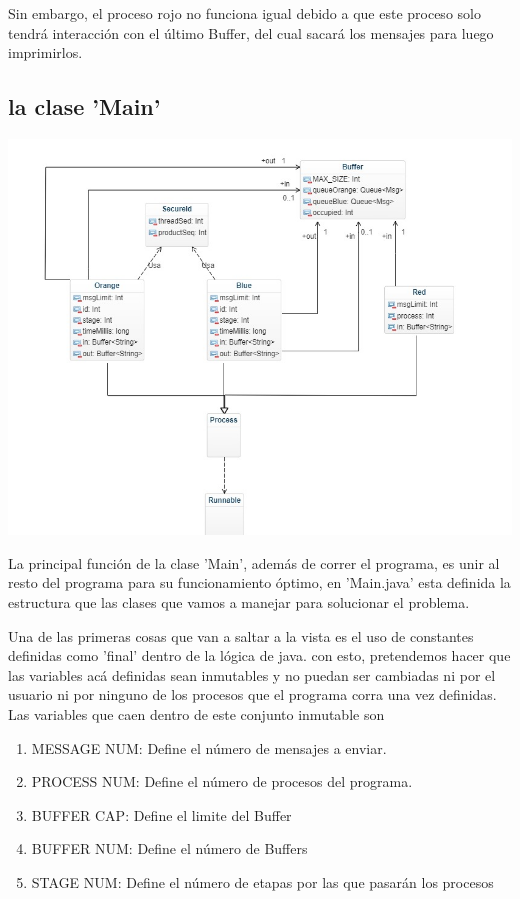 \documentclass[a4paper]{article}
\begin{document}
    Sin embargo, el proceso rojo no funciona igual debido a que este proceso solo tendrá interacción con el último Buffer, del cual sacará los mensajes para luego imprimirlos. 



    \subsection{la clase 'Main'}

    \includegraphics{uml.jpeg}

    La principal función de la clase 'Main', además de correr el programa,
    es unir al resto del programa para su funcionamiento óptimo, en 'Main.java'
    esta definida la estructura que las clases que vamos a manejar para solucionar
    el problema.

    Una de las primeras cosas que van a saltar a la vista es el uso de constantes
    definidas como 'final' dentro de la lógica de java. con esto, pretendemos 
    hacer que las variables acá definidas sean inmutables y no puedan ser cambiadas
    ni por el usuario ni por ninguno de los procesos que el programa corra una vez
    definidas. Las variables que caen dentro de este conjunto inmutable son

    \begin{enumerate}
        \item MESSAGE NUM: Define el número de mensajes a enviar.
        \item PROCESS NUM: Define el número de procesos del programa.
        \item BUFFER CAP: Define el limite del Buffer
        \item BUFFER NUM: Define el número de Buffers
        \item STAGE NUM: Define el número de etapas por las que pasarán los procesos
    \end{enumerate}
\end{document}
